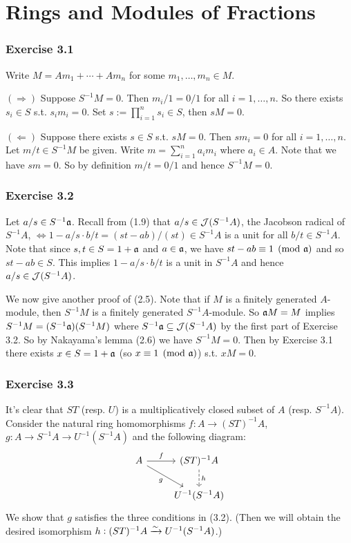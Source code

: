\documentclass[../A&M.tex]{subfiles}
\begin{document}
\chapter{Rings and Modules of Fractions}

\subsection*{Exercise 3.1}

Write $M = Am_1 + \cdots + Am_n$ for some $m_1,\ldots,m_n \in M$.

$(\Rightarrow)$ Suppose $S^{-1}M = 0$. Then $m_i/1 = 0/1$ for all $i=1,\ldots,n$. So there exists $s_i \in S$ s.t. $s_im_i = 0$. Set $s:=\prod_{i=1}^n s_i \in S$, then $sM=0$.

$(\Leftarrow)$ Suppose there exists $s\in S$ s.t. $sM=0$. Then $sm_i = 0$ for all $i=1,\ldots,n$. Let $m/t \in S^{-1}M$ be given. Write $m = \sum_{i=1}^n a_im_i$ where $a_i\in A$. Note that we have $sm = 0$. So by definition $m/t = 0/1$ and hence $S^{-1}M=0$.

\subsection*{Exercise 3.2}

Let $a/s \in S^{-1}\mathfrak{a}$. Recall from (1.9) that $a/s \in \mathcal{J}(S^{-1}A)$, the Jacobson radical of $S^{-1}A$, $\iff 1-a/s \cdot b/t = (st - ab)/(st) \in S^{-1}A$ is a unit for all $b/t \in S^{-1}A$. Note that since $s,t \in S = 1 + \mathfrak{a}$ and $a\in\mathfrak{a}$, we have $st - ab \equiv 1 \pmod{\mathfrak{a}}$ and so $st - ab \in S$. This implies $1-a/s \cdot b/t$ is a unit in $S^{-1}A$ and hence $a/s \in \mathcal{J}(S^{-1}A)$.

We now give another proof of (2.5). Note that if $M$ is a finitely generated $A$-module, then $S^{-1}M$ is a finitely generated $S^{-1}A$-module. So $\mathfrak{a} M=M$ implies $S^{-1}M = (S^{-1}\mathfrak{a})(S^{-1}M)$ where $S^{-1}\mathfrak{a} \subseteq \mathcal{J}(S^{-1}A)$ by the first part of Exercise 3.2. So by Nakayama's lemma (2.6) we have $S^{-1}M=0$. Then by Exercise 3.1 there exists $x\in S = 1 + \mathfrak{a}$ (so $x \equiv 1 \pmod{\mathfrak{a}}$) s.t. $xM=0$.

\subsection*{Exercise 3.3}

It's clear that $ST$ (resp. $U$) is a multiplicatively closed subset of $A$ (resp. $S^{-1}A$). Consider the natural ring homomorphisms $f:A \to (ST)^{-1}A$, $g:A \to S^{-1}A \to U^{-1}(S^{-1}A)$ and the following diagram:
$$
\begin{tikzcd}
  A \arrow[r, "f"] \arrow[dr, "g"'] & (ST)^{-1}A \arrow[d, dashrightarrow, "h"]   \\
										& U^{-1}(S^{-1}A)
\end{tikzcd}
$$
We show that $g$ satisfies the three conditions in (3.2). (Then we will obtain the desired isomorphism $h: (ST)^{-1}A \xrightarrow{\sim} U^{-1}(S^{-1}A)$.)
\end{document}
